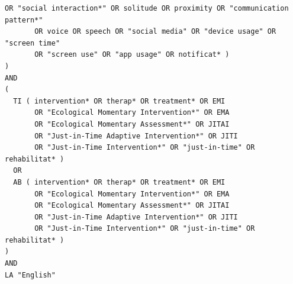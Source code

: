 \begin{lstlisting}[basicstyle=\ttfamily\small, breaklines=true, frame=single]
       OR "social interaction*" OR solitude OR proximity OR "communication pattern*" 
       OR voice OR speech OR "social media" OR "device usage" OR "screen time" 
       OR "screen use" OR "app usage" OR notificat* )
)
AND
(
  TI ( intervention* OR therap* OR treatment* OR EMI 
       OR "Ecological Momentary Intervention*" OR EMA 
       OR "Ecological Momentary Assessment*" OR JITAI 
       OR "Just-in-Time Adaptive Intervention*" OR JITI 
       OR "Just-in-Time Intervention*" OR "just-in-time" OR rehabilitat* )
  OR 
  AB ( intervention* OR therap* OR treatment* OR EMI 
       OR "Ecological Momentary Intervention*" OR EMA 
       OR "Ecological Momentary Assessment*" OR JITAI 
       OR "Just-in-Time Adaptive Intervention*" OR JITI 
       OR "Just-in-Time Intervention*" OR "just-in-time" OR rehabilitat* )
)
AND 
LA "English"
\end{lstlisting}